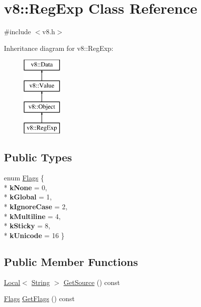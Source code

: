 \hypertarget{classv8_1_1_reg_exp}{}\section{v8\+:\+:Reg\+Exp Class Reference}
\label{classv8_1_1_reg_exp}


{\ttfamily \#include $<$v8.\+h$>$}

Inheritance diagram for v8\+:\+:Reg\+Exp\+:\begin{figure}[H]
\begin{center}
\leavevmode
\includegraphics[height=4.000000cm]{classv8_1_1_reg_exp}
\end{center}
\end{figure}
\subsection*{Public Types}
\begin{DoxyCompactItemize}
\item 
enum \hyperlink{classv8_1_1_reg_exp_aa4718a5c1f18472aff3bf51ed694fc5a}{Flags} \{ \\*
{\bfseries k\+None} = 0, 
\\*
{\bfseries k\+Global} = 1, 
\\*
{\bfseries k\+Ignore\+Case} = 2, 
\\*
{\bfseries k\+Multiline} = 4, 
\\*
{\bfseries k\+Sticky} = 8, 
\\*
{\bfseries k\+Unicode} = 16
 \}
\end{DoxyCompactItemize}
\subsection*{Public Member Functions}
\begin{DoxyCompactItemize}
\item 
\hyperlink{classv8_1_1_local}{Local}$<$ \hyperlink{classv8_1_1_string}{String} $>$ \hyperlink{classv8_1_1_reg_exp_a448213f2a92d964ed260b51429d5e590}{Get\+Source} () const 
\item 
\hyperlink{classv8_1_1_reg_exp_aa4718a5c1f18472aff3bf51ed694fc5a}{Flags} \hyperlink{classv8_1_1_reg_exp_ad5a5e77e6e626b3c7c69eef7ba2908cc}{Get\+Flags} () const 
\end{DoxyCompactItemize}
